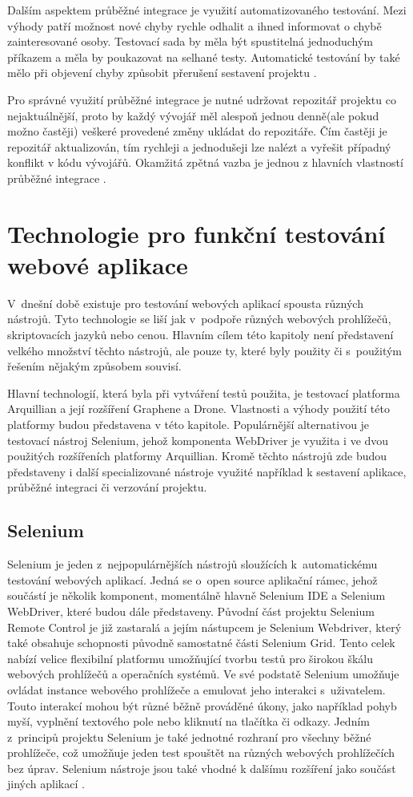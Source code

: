 \documentclass[
    color,   %
	table,   %
    twoside, %
    nolot, nolof
]{fithesis3}
\begin{document}
Dalším aspektem průběžné integrace je využití automatizovaného testování. Mezi výhody patří možnost nové chyby rychle odhalit a ihned informovat o chybě zainteresované osoby. Testovací sada by měla být spustitelná jednoduchým příkazem a měla by poukazovat na selhané testy. Automatické testování by také mělo při objevení chyby způsobit přerušení sestavení projektu \cite{Fowler}.

Pro správné využití průběžné integrace je nutné udržovat repozitář projektu co nejaktuálnější, proto by každý vývojář měl alespoň jednou denně(ale pokud možno častěji) veškeré provedené změny ukládat do repozitáře. Čím častěji je repozitář aktualizován, tím rychleji a jednodušeji lze nalézt a vyřešit případný konflikt v kódu vývojářů. Okamžitá zpětná vazba je jednou z hlavních vlastností průběžné integrace \cite{Fowler}.

\chapter{Technologie pro funkční testování webové aplikace}
\label{ch:chapter3}
V~dnešní době existuje pro testování webových aplikací spousta různých nástrojů. Tyto technologie se liší jak v~podpoře různých webových prohlížečů, skriptovacích jazyků nebo cenou. Hlavním cílem této kapitoly není představení velkého množství těchto nástrojů, ale pouze ty, které byly použity či s~použitým řešením nějakým způsobem souvisí.

Hlavní technologií, která byla při vytváření testů použita, je testovací platforma Arquillian a její rozšíření Graphene a Drone. Vlastnosti a výhody použití této platformy budou představena v této kapitole. Populárnější alternativou je testovací nástroj Selenium, jehož komponenta WebDriver je využita i ve dvou použitých rozšířeních platformy Arquillian. Kromě těchto nástrojů zde budou představeny i další specializované nástroje využité například k sestavení aplikace, průběžné integraci či verzování projektu.

\section{Selenium}
Selenium je jeden z~nejpopulárnějších nástrojů sloužících k~automatickému testování webových aplikací.   Jedná se o~open source aplikační rámec, jehož součástí je několik komponent, momentálně hlavně Selenium IDE a Selenium WebDriver, které budou dále představeny. Původní část projektu Selenium Remote Control je již zastaralá a jejím nástupcem je Selenium Webdriver, který také obsahuje schopnosti původně samostatné části Selenium Grid. Tento celek nabízí velice flexibilní platformu umožňující tvorbu testů pro širokou škálu webových prohlížečů a operačních systémů.
Ve své podstatě Selenium umožňuje ovládat instance webového prohlížeče a emulovat jeho interakci s~uživatelem. Touto interakcí mohou být různé běžně prováděné úkony, jako například pohyb myší, vyplnění textového pole nebo kliknutí na tlačítka či odkazy. Jedním z~principů projektu Selenium je také jednotné rozhraní pro všechny běžné prohlížeče, což umožňuje jeden test spouštět na různých webových prohlížečích bez úprav. Selenium nástroje jsou také vhodné k dalšímu rozšíření jako součást jiných aplikací \cite{SeleniumGithub}.
\end{document}
